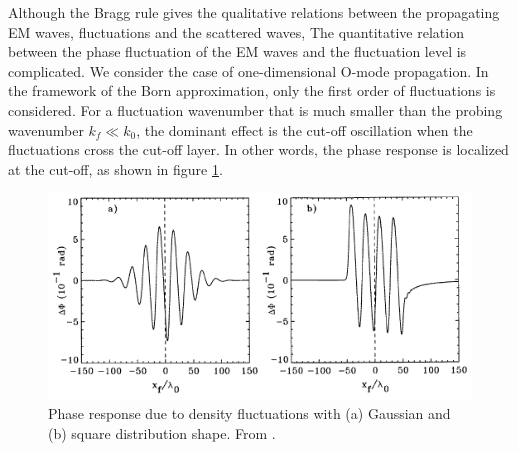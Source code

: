 Although the Bragg rule gives the qualitative relations between the propagating EM waves, fluctuations and the scattered waves, The quantitative relation between the phase fluctuation of the EM waves and the fluctuation level is complicated. We consider the case of one-dimensional O-mode propagation. In the framework of the Born approximation, only the first order of fluctuations is considered. For a fluctuation wavenumber that is much smaller than the probing wavenumber $k_f \ll k_0$, the dominant effect is the cut-off oscillation when the fluctuations cross the cut-off layer. In other words, the phase response is localized at the cut-off, as shown in figure \ref{fig:phase_response}.


\begin{figure}[h]
\begin{centering}
\includegraphics[scale=0.55]{phase_response.png}
\par\end{centering}
\caption[Phase response due to different distribution shapes of the density fluctuation]{Phase response due to density fluctuations with (a) Gaussian and (b) square distribution shape. From \cite{Fanack_1996_PPCF}.}
\label{fig:phase_response}
\end{figure}


